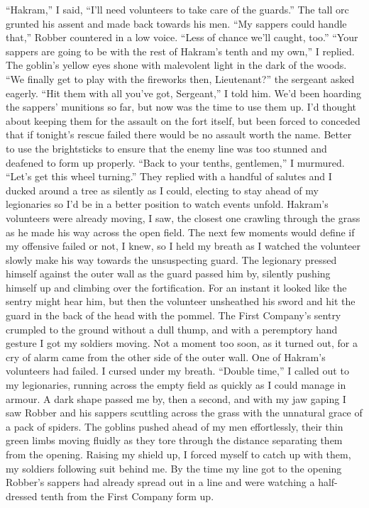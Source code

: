 \documentclass[12pt, openany]{book}
\begin{document}
“Hakram,” I said, “I’ll need volunteers to take care of the guards.”
The tall orc grunted his assent and made back towards his men.
“My sappers could handle that,” Robber countered in a low voice. “Less of chance we’ll caught, too.”
“Your sappers are going to be with the rest of Hakram’s tenth and my own,” I replied.
The goblin’s yellow eyes shone with malevolent light in the dark of the woods.
“We finally get to play with the fireworks then, Lieutenant?” the sergeant asked eagerly.
“Hit them with all you’ve got, Sergeant,” I told him.
We’d been hoarding the sappers’ munitions so far, but now was the time to use them up. I’d thought about keeping them for the assault on the fort itself, but been forced to conceded that if tonight’s rescue failed there would be no assault worth the name. Better to use the brightsticks to ensure that the enemy line was too stunned and deafened to form up properly.
“Back to your tenths, gentlemen,” I murmured. “Let’s get this wheel turning.”
They replied with a handful of salutes and I ducked around a tree as silently as I could, electing to stay ahead of my legionaries so I’d be in a better position to watch events unfold. Hakram’s volunteers were already moving, I saw, the closest one crawling through the grass as he made his way across the open field. The next few moments would define if my offensive failed or not, I knew, so I held my breath as I watched the volunteer slowly make his way towards the unsuspecting guard. The legionary pressed himself against the outer wall as the guard passed him by, silently pushing himself up and climbing over the fortification. For an instant it looked like the sentry might hear him, but then the volunteer unsheathed his sword and hit the guard in the back of the head with the pommel. The First Company’s sentry crumpled to the ground without a dull thump, and with a peremptory hand gesture I got my soldiers moving. Not a moment too soon, as it turned out, for a cry of alarm came from the other side of the outer wall. One of Hakram’s volunteers had failed. I cursed under my breath.
“Double time,” I called out to my legionaries, running across the empty field as quickly as I could manage in armour.
A dark shape passed me by, then a second, and with my jaw gaping I saw Robber and his sappers scuttling across the grass with the unnatural grace of a pack of spiders. The goblins pushed ahead of my men effortlessly, their thin green limbs moving fluidly as they tore through the distance separating them from the opening. Raising my shield up, I forced myself to catch up with them, my soldiers following suit behind me. By the time my line got to the opening Robber’s sappers had already spread out in a line and were watching a half-dressed tenth from the First Company form up.
\end{document}
